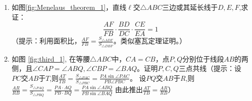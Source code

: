 \documentclass[12pt]{article}
\begin{document}
\begin{enumerate}
\begin{enumerate}[label=(\roman*)]
\item 如图\ref{fig:Menelaus_theorem_1}，直线$\ell$交$\triangle ABC$三边或其延长线于$D,E,F$,求证：
\begin{equation}
\frac{AF}{FB}\cdot\frac{BD}{DC}\cdot\frac{CE}{EA}=1
\end{equation}
（提示：利用面积比，$\frac{AF}{FB}=\frac{S_{\triangle ADF}}{S_{\triangle DBF}}$。类似塞瓦定理证明。）

\item 如图 \ref{fig:third_1}, 在等腰$\triangle ABC$中，$CA=CB$，点$P,Q$分别位于线段$AB$的两侧，且$\angle CAP = \angle ABQ,\angle CBP=\angle BAQ$。证明$P,C,Q$三点共线（提示：设$PC$交$AB$于$T$,则$\frac{AT}{TB}=\frac{S_{\triangle PAC}}{S_{\triangle PBC}}=\frac{PA\sin \angle PAC}{PB\angle PBC}$。
设$PQ$交$AB$于$R$,则$\frac{AR}{RB}=\frac{S_{\triangle PAQ}}{S_{\triangle PBQ}}=\frac{PA\cdot AQ}{PB\cdot BQ}=\frac{PA\sin\angle ABQ}{PB\sin\angle BAQ}$
由此推出$\frac{AT}{TB}=\frac{AR}{RB}$）


\end{enumerate}
\end{enumerate}
\end{document}
